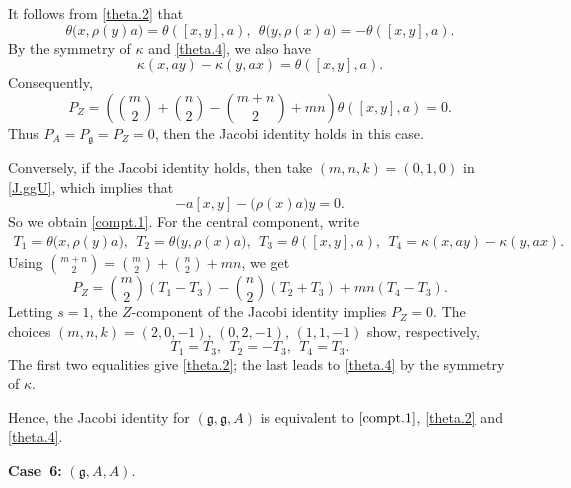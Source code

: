 \documentclass[12pt]{article}
\numberwithin{equation}{section}
\theoremstyle{definition}
\theoremstyle{plain}
\newcommand{\afCase}[1]{\textbf{Case~#1:}}
\newcommand{\fg}{\mathfrak{g}}
\begin{document}
It follows from \eqref{theta.2} that
\begin{equation*}
    \theta\big(x,\rho(y)a\big)=\theta([x,y],a),\ \ \theta\big(y,\rho(x)a\big)=-\theta([x,y],a).
\end{equation*}
By the symmetry of $\kappa$ and \eqref{theta.4}, we also have
\begin{equation*}
    \kappa(x,ay)-\kappa(y,ax)=\theta([x,y],a).
\end{equation*}
Consequently,
\begin{equation*}
    P_Z=\left(\binom{m}{2}+\binom{n}{2}-\binom{m+n}{2}+mn\right)\theta([x,y],a)=0.
\end{equation*}
Thus $P_A=P_\fg=P_Z=0$, then the Jacobi identity holds in this case.

Conversely, if the Jacobi identity holds, then take $(m,n,k)=(0,1,0)$ in \eqref{J.ggU}, which implies that
\begin{equation*}
    [x,ay]-a[x,y]-\big(\rho(x)a\big)y=0.
\end{equation*}
So we obtain \eqref{compt.1}. For the central component, write
\begin{align*}
    T_1=\theta\big(x,\rho(y)a\big),\ \ T_2=\theta\big(y,\rho(x)a\big),\ \ T_3=\theta([x,y],a),\ \ T_4=\kappa(x,ay)-\kappa(y,ax).
\end{align*}
Using $\binom{m+n}{2}=\binom{m}{2}+\binom{n}{2}+mn$, we get
\begin{equation*}
    P_Z=\binom{m}{2}(T_1-T_3)-\binom{n}{2}(T_2+T_3)+mn(T_4-T_3).
\end{equation*}
Letting $s=1$, the $Z$-component of the Jacobi identity implies $P_Z=0$. The choices $(m,n,k)=(2,0,-1)$, $(0,2,-1)$, $(1,1,-1)$ show, respectively,
\begin{equation*}
    T_1=T_3,\ \ T_2=-T_3,\ \ T_4=T_3.
\end{equation*}
The first two equalities give \eqref{theta.2}; the last leads to \eqref{theta.4} by the symmetry of $\kappa$.

Hence, the Jacobi identity for $(\fg,\fg,A)$ is equivalent to $\eqref{compt.1}$, \eqref{theta.2} and \eqref{theta.4}.

\afCase{6} $(\fg,A,A)$.
\end{document}
